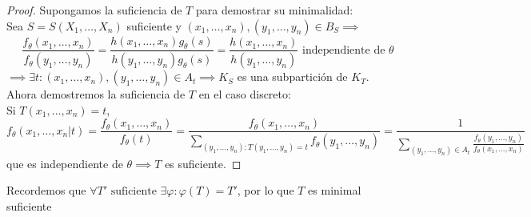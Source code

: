 \begin{proof}
  Supongamos la suficiencia de $T$ para demostrar su minimalidad: \\
  Sea $S = S(X_1, \ldots, X_n)$ suficiente y $(x_1, \ldots, x_n), (y_1, \ldots, y_n) \in B_S \implies$ $$\frac{f_{\theta}(x_1, \ldots, x_n)}{f_{\theta}(y_1, \ldots, y_n)} = \frac{h(x_1, \ldots, x_n)g_{\theta}(s)}{h(y_1, \ldots, y_n)g_{\theta}(s)} = \frac{h(x_1, \ldots, x_n)}{h(y_1, \ldots, y_n)} \text{ independiente de } \theta$$ $\implies \exists t : (x_1, \ldots, x_n), (y_1, \ldots, y_n) \in A_t \implies K_S$ es una subpartición de $K_T$.
  \\Ahora demostremos la suficiencia de $T$ en el caso discreto: \\
  Si $T(x_1, \ldots, x_n) = t$, 
  $$f_{\theta}(x_1, \ldots, x_n | t) = \frac{f_{\theta}(x_1, \ldots, x_n)}{f_ {\theta}(t)} = \frac{f_{\theta}(x_1, \ldots, x_n)}{\sum_{(y_1, \ldots, y_n) : T(y_1, \ldots, y_n) = t} f_{\theta}(y_1, \ldots, y_n)} = \frac{1}{\sum_{(y_1, \ldots, y_n) \in A_t} \frac{f_{\theta}(y_1, \ldots, y_n)}{f_{\theta}(x_1, \ldots, x_n)}}$$ que es independiente de $\theta \implies T$ es suficiente.
\end{proof}



\begin{observación}
  Recordemos que $\forall T' \text{ suficiente } \exists \varphi : \varphi(T) = T'$, por lo que $T$ es minimal suficiente
\end{observación}

